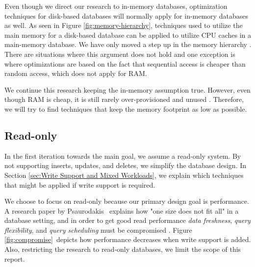 Even though we direct our research to in-memory databases, optimization techniques for disk-based databases will normally apply for in-memory databases as well. As seen in Figure \ref{fig:memory-hierarchy}, techniques used to utilize the main memory for a disk-based database can be applied to utilize CPU caches in a main-memory database. We have only moved a step up in the memory hierarchy \cite{Boncz2002-yj}. There are situations where this argument does not hold and one exception is where optimizations are based on the fact that sequential access is cheaper than random access, which does not apply for RAM.

We continue this research keeping the in-memory assumption true. However, even though RAM is cheap, it is still rarely over-provisioned and unused \cite{Barber2014-ey}. Therefore, we will try to find techniques that keep the memory footprint as low as possible.


\subsection{Read-only}
\label{sub:Read-only}
In the first iteration towards the main goal, we assume a read-only system. By not supporting inserts, updates, and deletes, we simplify the database design. In Section \ref{sec:Write Support and Mixed Workloads}, we explain which techniques that might be applied if write support is required.

We choose to focus on read-only because our primary design goal is performance. A research paper by Psaurodakis \ea~explains how "one size does not fit all" in a database setting, and in order to get good read performance \textit{data freshness}, \textit{query flexibility}, and \textit{query scheduling} must be compromised \cite{Psaroudakis2014-ma}. Figure \ref{fig:compromise}~depicts how performance decreases when write support is added. Also, restricting the research to read-only databases, we limit the scope of this report. 


